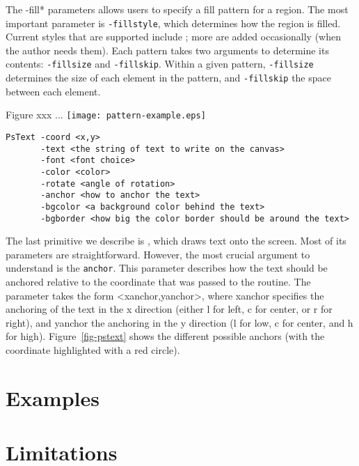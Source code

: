 The -fill* parameters allows users to specify a fill pattern for a region. The
most important parameter is \texttt{-fillstyle}, which determines how the
region is filled. Current styles that are supported include ; more are
added occasionally (when the author needs them). Each pattern takes two
arguments to determine its contents: \texttt{-fillsize} and
\texttt{-fillskip}. Within a given pattern, \texttt{-fillsize} determines 
the size of each element in the pattern, and \texttt{-fillskip} the space
between each element. 

Figure xxx ...
\texttt{[image: pattern-example.eps]}

\begin{verbatim}
PsText -coord <x,y>
       -text <the string of text to write on the canvas>
       -font <font choice>
       -color <color>
       -rotate <angle of rotation>
       -anchor <how to anchor the text>
       -bgcolor <a background color behind the text>
       -bgborder <how big the color border should be around the text>
\end{verbatim}

The last primitive we describe is \pstext, which draws text onto the
screen. Most of its parameters are straightforward. However, the most crucial
argument to understand is the \texttt{anchor}. This parameter describes how
the text should be anchored relative to the coordinate that was passed to the
routine. The parameter takes the form <xanchor,yanchor>, where xanchor
specifies the anchoring of the text in the x direction (either l for left, c
for center, or r for right), and yanchor the anchoring in the y direction (l
for low, c for center, and h for high). Figure~\ref{fig-pstext} shows the
different possible anchors (with the coordinate highlighted with a red
circle).  

\begin{}
\end{}


\section{Examples}





\section{Limitations}


